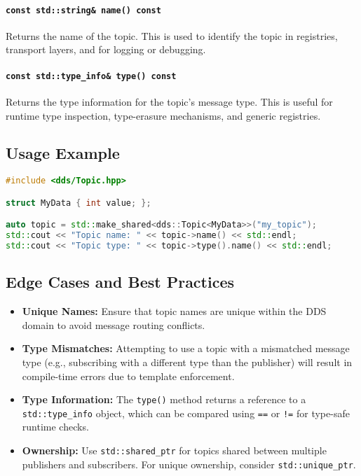 \documentclass[12pt]{report}
\begin{document}
\paragraph{\texttt{const std::string\& name() const}}
Returns the name of the topic. This is used to identify the topic in registries, transport layers, and for logging or debugging.

\paragraph{\texttt{const std::type\_info\& type() const}}
Returns the type information for the topic's message type. This is useful for runtime type inspection, type-erasure mechanisms, and generic registries.

\subsection{Usage Example}
\begin{lstlisting}[language=C++]
#include <dds/Topic.hpp>

struct MyData { int value; };

auto topic = std::make_shared<dds::Topic<MyData>>("my_topic");
std::cout << "Topic name: " << topic->name() << std::endl;
std::cout << "Topic type: " << topic->type().name() << std::endl;
\end{lstlisting}

\subsection{Edge Cases and Best Practices}
\begin{itemize}
    \item \textbf{Unique Names:} Ensure that topic names are unique within the DDS domain to avoid message routing conflicts.
    \item \textbf{Type Mismatches:} Attempting to use a topic with a mismatched message type (e.g., subscribing with a different type than the publisher) will result in compile-time errors due to template enforcement.
    \item \textbf{Type Information:} The \texttt{type()} method returns a reference to a \texttt{std::type\_info} object, which can be compared using \texttt{==} or \texttt{!=} for type-safe runtime checks.
    \item \textbf{Ownership:} Use \texttt{std::shared\_ptr} for topics shared between multiple publishers and subscribers. For unique ownership, consider \texttt{std::unique\_ptr}.
\end{itemize}
\end{document}
